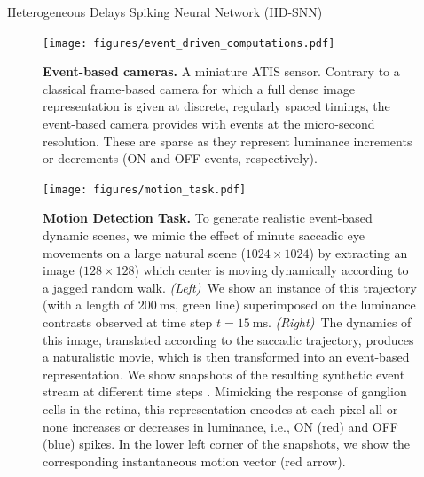\documentclass[final]{beamer}
\newcommand{\ms}{\si{\milli\second}}%
\newlength{\colwidth}
\begin{document}
\begin{frame}[t]
\begin{columns}[t]
\begin{column}{\colwidth}
\begin{block}{Heterogeneous Delays Spiking Neural Network (HD-SNN)~\parencite{Grimaldi23BC}}
\begin{figure}%
	{ \centering
	\texttt{[image: figures/event\_driven\_computations.pdf]}
	\caption{\small %
	\textbf{ Event-based cameras.}
	A miniature ATIS sensor. Contrary to a classical frame-based camera for which a full dense image representation is given at discrete, regularly spaced timings, the event-based camera provides with events at the micro-second resolution. These are sparse as they represent luminance increments or decrements (ON and OFF events, respectively).
	}
	\label{fig:silicon_retina}
		}
\end{figure}
\begin{figure}%
    \centering
    \texttt{[image: figures/motion\_task.pdf]}
    \caption{
       \textbf{ Motion Detection Task.} To generate realistic event-based dynamic scenes, we mimic the effect of minute saccadic eye movements on a large natural scene ($1024\times1024$) by extracting an image ($128\times128$) which center is moving dynamically according to a jagged random walk. \textit{(Left)}~We show an instance of this trajectory (with a length of $200~\ms$, green line) superimposed on the luminance contrasts observed at time step $t=15~\ms$. \textit{(Right)}~The dynamics of this image, translated according to the saccadic trajectory, produces a naturalistic movie, which is then transformed into an event-based representation. We show snapshots of the resulting synthetic event stream at different time steps .%
         Mimicking the response of ganglion cells in the retina, this representation encodes at each pixel all-or-none increases or decreases in luminance, i.e., ON (red) and OFF (blue) spikes. In the lower left corner of the snapshots, we show the corresponding instantaneous motion vector (red arrow). %
        }
    \label{fig:motion_task}
\end{figure}


\end{block}
\end{column}
\end{columns}
\end{frame}
\end{document}
